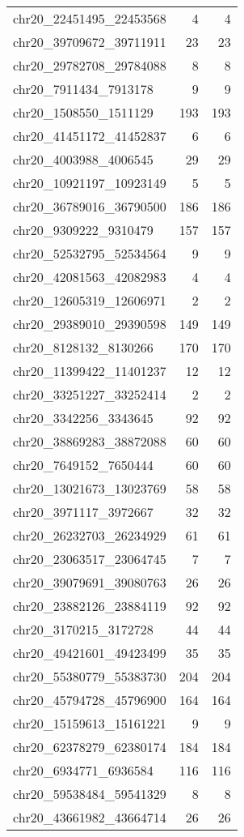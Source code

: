 \begin{longtable}{lrr}
chr20_22451495_22453568 & 4 & 4 \\
chr20_39709672_39711911 & 23 & 23 \\
chr20_29782708_29784088 & 8 & 8 \\
chr20_7911434_7913178 & 9 & 9 \\
chr20_1508550_1511129 & 193 & 193 \\
chr20_41451172_41452837 & 6 & 6 \\
chr20_4003988_4006545 & 29 & 29 \\
chr20_10921197_10923149 & 5 & 5 \\
chr20_36789016_36790500 & 186 & 186 \\
chr20_9309222_9310479 & 157 & 157 \\
chr20_52532795_52534564 & 9 & 9 \\
chr20_42081563_42082983 & 4 & 4 \\
chr20_12605319_12606971 & 2 & 2 \\
chr20_29389010_29390598 & 149 & 149 \\
chr20_8128132_8130266 & 170 & 170 \\
chr20_11399422_11401237 & 12 & 12 \\
chr20_33251227_33252414 & 2 & 2 \\
chr20_3342256_3343645 & 92 & 92 \\
chr20_38869283_38872088 & 60 & 60 \\
chr20_7649152_7650444 & 60 & 60 \\
chr20_13021673_13023769 & 58 & 58 \\
chr20_3971117_3972667 & 32 & 32 \\
chr20_26232703_26234929 & 61 & 61 \\
chr20_23063517_23064745 & 7 & 7 \\
chr20_39079691_39080763 & 26 & 26 \\
chr20_23882126_23884119 & 92 & 92 \\
chr20_3170215_3172728 & 44 & 44 \\
chr20_49421601_49423499 & 35 & 35 \\
chr20_55380779_55383730 & 204 & 204 \\
chr20_45794728_45796900 & 164 & 164 \\
chr20_15159613_15161221 & 9 & 9 \\
chr20_62378279_62380174 & 184 & 184 \\
chr20_6934771_6936584 & 116 & 116 \\
chr20_59538484_59541329 & 8 & 8 \\
chr20_43661982_43664714 & 26 & 26 \\

\end{longtable}
